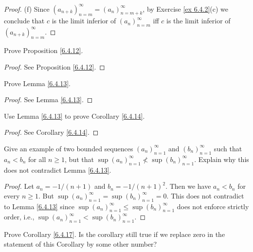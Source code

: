 \begin{proof}{(f)}
    Since \((a_{n + k})_{n = m}^\infty = (a_n)_{n = m + k}^\infty\), by Exercise \ref{ex 6.4.2}(c) we conclude that \(c\) is the limit inferior of \((a_n)_{n = m}^\infty\) iff \(c\) is the limit inferior of \((a_{n + k})_{n = m}^\infty\).
\end{proof}

\begin{exercise}\label{ex 6.4.3}
    Prove Proposition \ref{6.4.12}.
\end{exercise}

\begin{proof}
    See Proposition \ref{6.4.12}.
\end{proof}

\begin{exercise}\label{ex 6.4.4}
    Prove Lemma \ref{6.4.13}.
\end{exercise}

\begin{proof}
    See Lemma \ref{6.4.13}.
\end{proof}

\begin{exercise}\label{ex 6.4.5}
    Use Lemma \ref{6.4.13} to prove Corollary \ref{6.4.14}.
\end{exercise}

\begin{proof}
    See Corollary \ref{6.4.14}.
\end{proof}

\begin{exercise}\label{ex 6.4.6}
    Give an example of two bounded sequences \((a_n)_{n = 1}^\infty\) and \((b_n)_{n = 1}^\infty\) such that \(a_n < b_n\) for all \(n \geq 1\), but that \(\sup(a_n)_{n = 1}^\infty \not< \sup(b_n)_{n = 1}^\infty\).
    Explain why this does not contradict Lemma \ref{6.4.13}.
\end{exercise}

\begin{proof}
    Let \(a_n = -1 / (n + 1)\) and \(b_n = -1 / (n + 1)^2\).
    Then we have \(a_n < b_n\) for every \(n \geq 1\).
    But \(\sup(a_n)_{n = 1}^\infty = \sup(b_n)_{n = 1}^\infty = 0\).
    This does not contradict to Lemma \ref{6.4.13} since \(\sup(a_n)_{n = 1}^\infty \leq \sup(b_n)_{n = 1}^\infty\) does not enforce strictly order, i.e., \(\sup(a_n)_{n = 1}^\infty < \sup(b_n)_{n = 1}^\infty\).
\end{proof}

\begin{exercise}\label{ex 6.4.7}
    Prove Corollary \ref{6.4.17}.
    Is the corollary still true if we replace zero in the statement of this Corollary by some other number?
\end{exercise}

